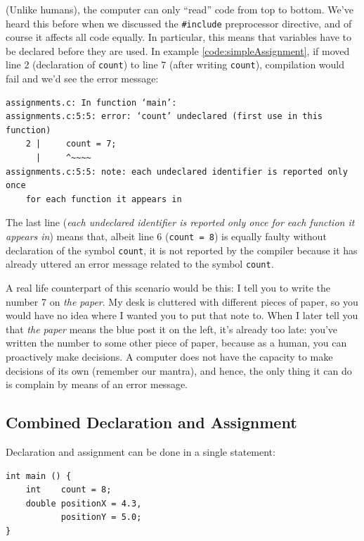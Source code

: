 \begin{hintbox}
(Unlike humans), the computer can only \enquote{read} code from top to bottom. We've heard this before when we discussed the \texttt{\#include} preprocessor directive, and of course it affects all code equally. In particular, this means that variables have to be declared before they are used. In example \ref{code:simpleAssignment}, if moved line 2 (declaration of \texttt{count}) to line 7 (after writing \texttt{count}), compilation would fail and we'd see the error message:

\begin{cmdbox}
\begin{verbatim}
assignments.c: In function ‘main’:
assignments.c:5:5: error: ‘count’ undeclared (first use in this function)
    2 |     count = 7;
      |     ^~~~~
assignments.c:5:5: note: each undeclared identifier is reported only once 
    for each function it appears in
\end{verbatim}
\end{cmdbox}

The last line (\emph{each undeclared identifier is reported only once for each function it appears in}) means that, albeit line 6 (\texttt{count = 8}) is equally faulty without declaration of the symbol \texttt{count}, it is not reported by the compiler because it has already uttered an error message related to the symbol \texttt{count}.
\end{hintbox}
%
\begin{hintbox}[]
A real life counterpart of this scenario would be this: I tell you to write the number 7 on \emph{the paper}. My desk is cluttered with different pieces of paper, so you would have no idea where I wanted you to put that note to. When I later tell you that \emph{the paper} means the blue post it on the left, it's already too late: you've written the number to some other piece of paper, because as a human, you can proactively make decisions. A computer does not have the capacity to make decisions of its own (remember our mantra), and hence, the only thing it can do is complain by means of an error message.
\end{hintbox}


\subsection{Combined Declaration and Assignment} \label{sec:valueAssignment}
Declaration and assignment can be done in a single statement:
\begin{codebox}[combinedAssignments.c]
\begin{verbatim}
int main () {
    int    count = 8;
    double positionX = 4.3,
           positionY = 5.0;
}
\end{verbatim}
 \label{code:combinedAssignment}
\end{codebox}

